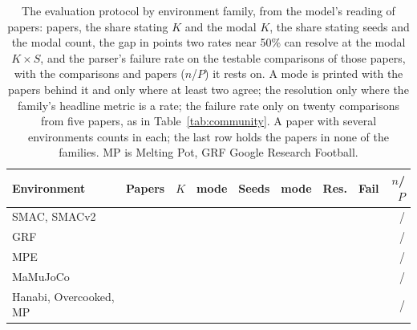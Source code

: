 \documentclass[sigconf,anonymous]{aamas}
\begin{document}
\begin{table}[t]
\caption{The evaluation protocol by environment family, from the model's
reading of \nPtwoPapers{} papers: papers, the share stating $K$ and the
modal $K$, the share stating seeds and the modal count, the gap in points
two rates near 50\% can resolve at the modal $K \times S$, and the
parser's failure rate on the testable comparisons of those papers, with
the comparisons and papers ($n$/$P$) it rests on. A mode is printed with
the papers behind it and only where at least two agree; the resolution
only where the family's headline metric is a rate; the failure rate only
on twenty comparisons from five papers, as in Table~\ref{tab:community}.
A paper with several environments counts in each; the last row holds the
papers in none of the families. MP is Melting Pot, GRF Google Research
Football.}
\label{tab:env}
\scriptsize
\setlength{\tabcolsep}{2pt}
\begin{tabular}{@{}lrrrrrrrr@{}}
\toprule
Environment & Papers & $K$ & mode & Seeds & mode & Res. & Fail & $n$/$P$ \\
\midrule
SMAC, SMACv2 & \nPenvSmacSmacvPapers{} & \nPenvSmacSmacvStateK{} & \nPenvSmacSmacvModalK{} & \nPenvSmacSmacvStateSeeds{} & \nPenvSmacSmacvModalSeeds{} & \nPenvSmacSmacvResolution{} & \nPenvSmacSmacvFail{} & \nPenvSmacSmacvTestable{}/\nPenvSmacSmacvTestablePapers{} \\
GRF & \nPenvGoogleResearchFootballPapers{} & \nPenvGoogleResearchFootballStateK{} & \nPenvGoogleResearchFootballModalK{} & \nPenvGoogleResearchFootballStateSeeds{} & \nPenvGoogleResearchFootballModalSeeds{} & \nPenvGoogleResearchFootballResolution{} & \nPenvGoogleResearchFootballFail{} & \nPenvGoogleResearchFootballTestable{}/\nPenvGoogleResearchFootballTestablePapers{} \\
MPE & \nPenvMpePapers{} & \nPenvMpeStateK{} & \nPenvMpeModalK{} & \nPenvMpeStateSeeds{} & \nPenvMpeModalSeeds{} & \nPenvMpeResolution{} & \nPenvMpeFail{} & \nPenvMpeTestable{}/\nPenvMpeTestablePapers{} \\
MaMuJoCo & \nPenvMamujocoPapers{} & \nPenvMamujocoStateK{} & \nPenvMamujocoModalK{} & \nPenvMamujocoStateSeeds{} & \nPenvMamujocoModalSeeds{} & \nPenvMamujocoResolution{} & \nPenvMamujocoFail{} & \nPenvMamujocoTestable{}/\nPenvMamujocoTestablePapers{} \\
Hanabi, Overcooked, MP & \nPenvHanabiOvercookedMeltingPotPapers{} & \nPenvHanabiOvercookedMeltingPotStateK{} & \nPenvHanabiOvercookedMeltingPotModalK{} & \nPenvHanabiOvercookedMeltingPotStateSeeds{} & \nPenvHanabiOvercookedMeltingPotModalSeeds{} & \nPenvHanabiOvercookedMeltingPotResolution{} & \nPenvHanabiOvercookedMeltingPotFail{} & \nPenvHanabiOvercookedMeltingPotTestable{}/\nPenvHanabiOvercookedMeltingPotTestablePapers{} \\

\end{tabular}
\end{table}
\end{document}
